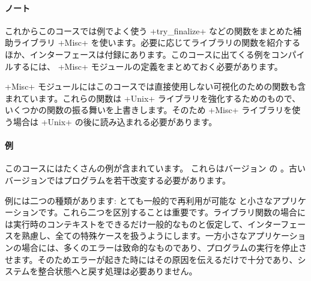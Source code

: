 \paragraph{ノート}

これからこのコースでは例でよく使う \ml+try_finalize+ などの関数をまとめた補助ライブラリ \ml+Misc+ を使います。必要に応じてライブラリの関数を紹介するほか、インターフェースは付録にあります。このコースに出てくる例をコンパイルするには、 \ml+Misc+ モジュールの定義をまとめておく必要があります。

\ml+Misc+ モジュールにはこのコースでは直接使用しない可視化のための関数も含まれています。これらの関数は \ml+Unix+ ライブラリを強化するためのもので、いくつかの関数の振る舞いを上書きします。そのため \ml+Misc+ ライブラリを使う場合は \ml+Unix+ の後に読み込まれる必要があります。

\paragraph{例}

このコースにはたくさんの例が含まれています。 これらはバージョン \ocamlversion の 。古いバージョンではプログラムを若干改変する必要があります。

例には二つの種類があります: とても一般的で再利用が可能な  と小さなアプリケーションです。これら二つを区別することは重要です。ライブラリ関数の場合には実行時のコンテキストをできるだけ一般的なものと仮定して、インターフェースを熟慮し、全ての特殊ケースを扱うようにします。一方小さなアプリケーションの場合には、多くのエラーは致命的なものであり、プログラムの実行を停止させます。そのためエラーが起きた時にはその原因を伝えるだけで十分であり、システムを整合状態へと戻す処理は必要ありません。
